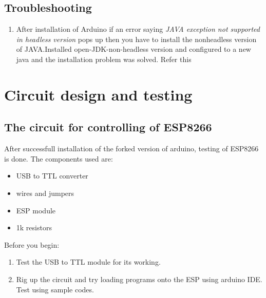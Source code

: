 \documentclass[16pt]{article}
\begin{document}
\vspace{0.5cm}

\subsection{Troubleshooting}

\begin{enumerate}

\item
  After installation of Arduino if an error saying \emph{JAVA exception
  not supported in headless version} pops up then you have to install
  the nonheadless version of JAVA.Installed open-JDK-non-headless
  version and configured to a new java and the installation problem was
  solved. Refer this
\end{enumerate}


\vspace{3.5cm}

\section{Circuit design and testing}



\subsection{The circuit for controlling of ESP8266}

\vspace{0.5cm}

After successfull installation of the forked version of arduino, testing
of ESP8266 is done. The components used are:

\begin{itemize}

\item
  USB to TTL converter
\item
  wires and jumpers
\item
  ESP module
\item
  1k resistors
\end{itemize}

Before you begin:

\begin{enumerate}

\item
  Test the USB to TTL module for its working.
\item
  Rig up the circuit and try loading programs onto the ESP using arduino
  IDE. Test using sample codes.
\end{enumerate}
\end{document}
